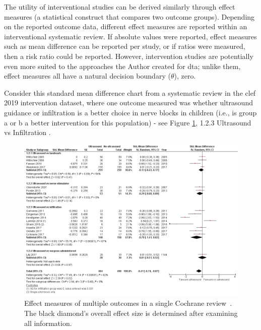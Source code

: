 \documentclass[10pt,oneside]{book}
\begin{document}
The utility of interventional studies can be derived similarly through effect measures (a statistical construct that compares two outcome groups). Depending on the reported outcome data, different effect measures are reported within an interventional systematic review. If absolute values were reported, effect measures such as mean difference can be reported per study, or if ratios were measured, then a risk ratio could be reported. However, intervention studies are potentially even more suited to the approaches the Author created for \gls*{dta}; unlike them, effect measures all have a natural decision boundary ($\theta$), zero. 

Consider this standard mean difference chart from a systematic review in the \gls*{clef} 2019 intervention dataset, where one outcome measured was whether ultrasound guidance or infiltration is a better choice in nerve blocks in children (i.e., is group a or b a better intervention for this population) - see Figure \ref{fig:cochrane_ultrasound}, 1.2.3 Ultrasound vs Infiltration \cite{the_cochrane_collaboration_use_2014}.

\begin{figure}
    \centering
    \includegraphics[width=1\linewidth]{Confirmation Review/images/cochrane_ultrasound.png}
    \caption{Effect measures of multiple outcomes in a single Cochrane review~\cite{norman_cochrane_2018}. The black diamond's overall effect size is determined after examining all information.\protect\footnotemark}
    \label{fig:cochrane_ultrasound}
\end{figure}

\end{document}
